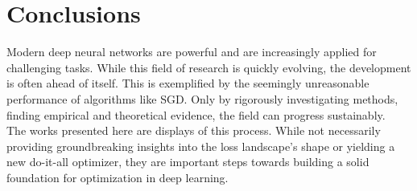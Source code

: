 \documentclass[a4paper]{scrartcl}
\begin{document}
\section*{Conclusions}
Modern deep neural networks are powerful and are increasingly applied for challenging tasks. While this field of research is quickly evolving, the development is often ahead of itself. This is exemplified by the seemingly unreasonable performance of algorithms like SGD. Only by rigorously investigating methods, finding empirical and theoretical evidence, the field can progress sustainably.\\
The works presented here are displays of this process. While not necessarily providing groundbreaking insights into the loss landscape's shape or yielding a new do-it-all optimizer, they are important steps towards building a solid foundation for optimization in deep learning.



\newpage



	
\end{document}
